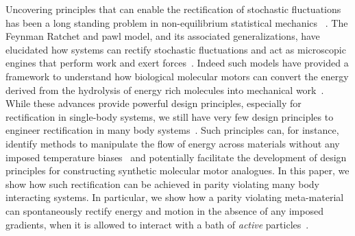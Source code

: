 \documentclass[
 preprint,
 preprintnumbers,
 amsmath,amssymb,
 aps,
 pre,
 longbibliography,
 superscriptaddress,
 10pt, twocolumn
]{revtex4-1}
\begin{document}

Uncovering principles that can enable the rectification of stochastic fluctuations has been a long standing problem in non-equilibrium statistical mechanics ~\cite{Seifert2012StochasticThermodynamics,Coskun2011GreatExpectations}. The Feynman Ratchet and pawl model, and its associated generalizations, have elucidated how systems can rectify stochastic fluctuations and act as microscopic engines that perform work and exert forces~\cite{Jarzynski1999FeynmanRatchet}. Indeed such models have provided a framework to understand how biological molecular motors can convert the energy derived from the hydrolysis of energy rich molecules into mechanical work~\cite{Mogilner1996CellMotility,Chernyak2008PumpingRestriction,Rahav2008DirectedFlow,Sinitsyn2007UniversalGeometric}. While these advances provide powerful design principles, especially for rectification in single-body systems, we still have very few design principles to engineer rectification in many body systems~\cite{Seifert2012StochasticThermodynamics}. Such principles can, for instance, identify methods to manipulate the flow of energy across materials without any imposed temperature biases~\cite{Zhu2016PersistentDirectional,Zhu2018TheoryManybody,Dubi2011ColloquiumHeat,Kanazawa2013HeatConduction,Martinez2017ColloidalHeat} and potentially facilitate the development of design principles for constructing synthetic molecular motor analogues. In this paper, we show how such rectification can be achieved in parity violating many body interacting systems. In particular, we show how a parity violating meta-material~\cite{Nash2015TopologicalMechanics} can spontaneously rectify energy and motion in the absence of any imposed gradients, when it is allowed to interact with a bath of \textit{active} particles~\cite{Marchetti2013HydrodynamicsSoft,Koumakis2013TargetedDelivery,Woodhouse2018AutonomousActuation}. 


\end{document}
